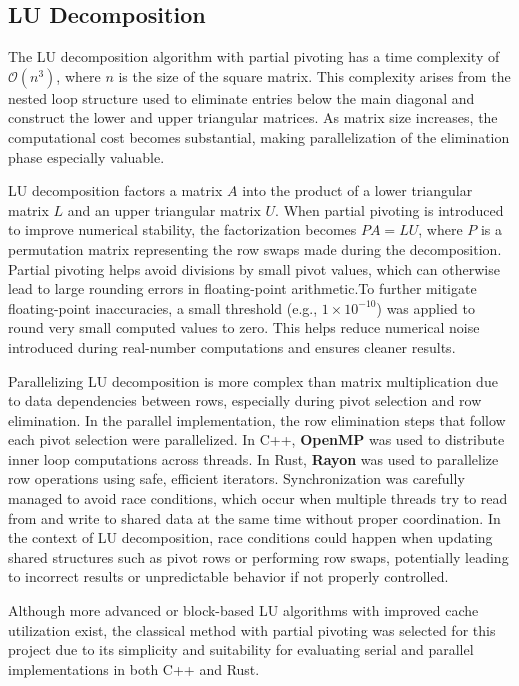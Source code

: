 \documentclass[12pt]{article}
\begin{document}
\subsection*{LU Decomposition}
The LU decomposition algorithm with partial pivoting has a time complexity of \( \mathcal{O}(n^3) \), where \( n \) is the size of the square matrix.
This complexity arises from the nested loop structure used to eliminate entries below the main diagonal and construct the lower and upper triangular matrices.
As matrix size increases, the computational cost becomes substantial, making parallelization of the elimination phase especially valuable.

LU decomposition factors a matrix \( A \) into the product of a lower triangular matrix \( L \) and an upper triangular matrix \( U \). When partial
pivoting is introduced to improve numerical stability, the factorization becomes \( PA = LU \), where \( P \) is a permutation matrix representing the
row swaps made during the decomposition. Partial pivoting helps avoid divisions by small pivot values, which can otherwise lead to large rounding errors
in floating-point arithmetic.To further mitigate floating-point inaccuracies, a small threshold (e.g., \(1 \times 10^{-10}\)) was applied to round very
small computed values to zero. This helps reduce numerical noise introduced during real-number computations and ensures cleaner results.

Parallelizing LU decomposition is more complex than matrix multiplication due to data dependencies between rows, especially during pivot selection and row
elimination. In the parallel implementation, the row elimination steps that follow each pivot selection were parallelized. In C++, \textbf{OpenMP} was used
to distribute inner loop computations across threads. In Rust, \textbf{Rayon} was used to parallelize row operations using safe, efficient iterators.
Synchronization was carefully managed to avoid race conditions, which occur when multiple threads try to read from and write to shared data at the same time without proper coordination. In the context of LU decomposition, race conditions could happen when updating shared structures such as pivot rows or performing row swaps, potentially leading to incorrect results or unpredictable behavior if not properly controlled.

Although more advanced or block-based LU algorithms with improved cache utilization exist, the classical method with partial pivoting was selected for this
project due to its simplicity and suitability for evaluating serial and parallel implementations in both C++ and Rust.
\end{document}

